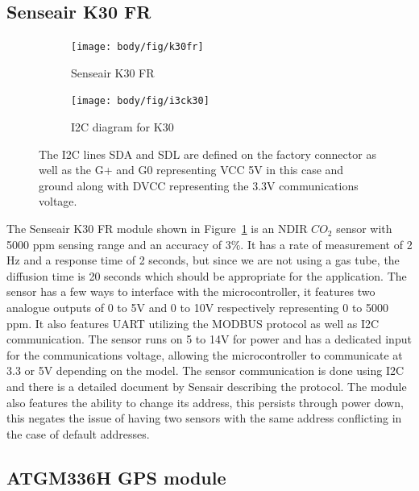 \subsection{Senseair K30 FR}
\begin{figure}[!htb]
	\begin{subfigure}{0.45\textwidth}
    	\texttt{[image: body/fig/k30fr]}
    	\caption{Senseair K30 FR}
    	\label{fig:k30fr}	    
	\end{subfigure}
    \begin{subfigure}{0.45\textwidth}
    	\texttt{[image: body/fig/i3ck30]}
    	\caption{I2C diagram for K30}
    	\label{fig:i3ck30}   
    \end{subfigure}

 \caption[Senseair K30]{The I2C lines SDA and SDL are defined on the factory connector as well as the G+ and G0 representing VCC 5V in this case and ground along with DVCC representing the 3.3V communications voltage.}
\end{figure}
The Senseair K30 FR module shown in Figure~\ref{fig:k30fr} is an NDIR $ CO_2 $ sensor with 5000 ppm sensing range and an accuracy of 3\%. It has a rate of measurement of 2 Hz and a response time of 2 seconds, but since we are not using a gas tube, the diffusion time is 20 seconds which should be appropriate for the application. The sensor has a few ways to interface with the microcontroller, it features two analogue outputs of 0 to 5V and 0 to 10V respectively representing 0 to 5000 ppm. It also features UART utilizing the MODBUS protocol as well as I2C communication. The sensor runs on 5 to 14V for power and has a dedicated input for the communications voltage, allowing the microcontroller to communicate at 3.3 or 5V depending on the model. The sensor communication is done using I2C and there is a detailed document by Sensair describing the protocol. The module also features the ability to change its address, this persists through power down, this negates the issue of having two sensors with the same address conflicting in the case of default addresses. 

\pagebreak
\subsection{ATGM336H GPS module}

